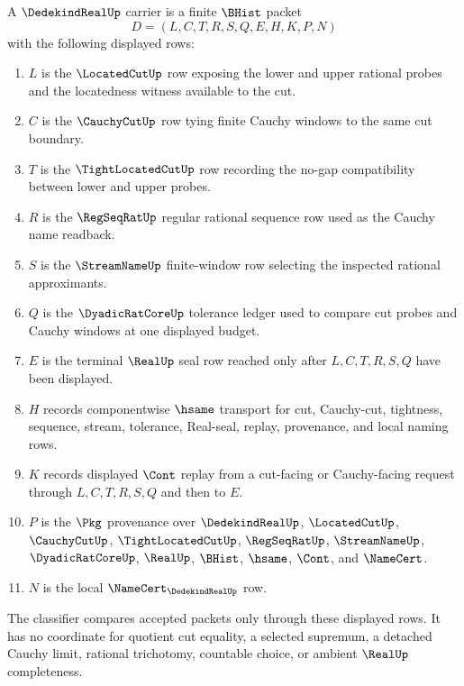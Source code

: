 \begin{definition}
\label{def:dedekind-real-carrier}
A $\DedekindRealUp$ carrier is a finite $\BHist$ packet
$$
D=(L,C,T,R,S,Q,E,H,K,P,N)
$$
with the following displayed rows:
\begin{enumerate}
\item $L$ is the $\LocatedCutUp$ row exposing the lower and upper rational probes and the locatedness witness available to the cut.
\item $C$ is the $\CauchyCutUp$ row tying finite Cauchy windows to the same cut boundary.
\item $T$ is the $\TightLocatedCutUp$ row recording the no-gap compatibility between lower and upper probes.
\item $R$ is the $\RegSeqRatUp$ regular rational sequence row used as the Cauchy name readback.
\item $S$ is the $\StreamNameUp$ finite-window row selecting the inspected rational approximants.
\item $Q$ is the $\DyadicRatCoreUp$ tolerance ledger used to compare cut probes and Cauchy windows at one displayed budget.
\item $E$ is the terminal $\RealUp$ seal row reached only after $L,C,T,R,S,Q$ have been displayed.
\item $H$ records componentwise $\hsame$ transport for cut, Cauchy-cut, tightness, sequence, stream, tolerance, Real-seal, replay, provenance, and local naming rows.
\item $K$ records displayed $\Cont$ replay from a cut-facing or Cauchy-facing request through $L,C,T,R,S,Q$ and then to $E$.
\item $P$ is the $\Pkg$ provenance over $\DedekindRealUp$, $\LocatedCutUp$, $\CauchyCutUp$, $\TightLocatedCutUp$, $\RegSeqRatUp$, $\StreamNameUp$, $\DyadicRatCoreUp$, $\RealUp$, $\BHist$, $\hsame$, $\Cont$, and $\NameCert$.
\item $N$ is the local $\NameCert_{\DedekindRealUp}$ row.
\end{enumerate}
The classifier compares accepted packets only through these displayed rows. It has no coordinate for quotient cut equality, a selected supremum, a detached Cauchy limit, rational trichotomy, countable choice, or ambient $\RealUp$ completeness.
\end{definition}

